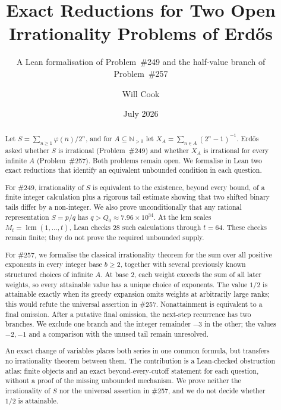\documentclass[11pt]{article}
\title{Exact Reductions for Two Open Irrationality Problems of Erd\H{o}s}
\subtitle{A Lean formalisation of Problem~\#249 and the half-value branch of Problem~\#257}
\author{Will Cook}
\date{July 2026}
\theoremstyle{definition}
\theoremstyle{remark}
\newcommand{\Npos}{\mathbb{N}_{>0}}
\newcommand{\ph}{\varphi}
\newcommand{\lcm}{\operatorname{lcm}}
\newcommand{\Qzero}{Q_0}
\begin{document}
\maketitle
{}

\begin{abstract}
\noindent
Let $S=\sum_{n\geq1}\ph(n)/2^n$, and for $A\subseteq\Npos$ let
$X_A=\sum_{n\in A}(2^n-1)^{-1}$.  Erd\H{o}s asked whether $S$ is
irrational (Problem~\#249) and whether $X_A$ is irrational for every
infinite $A$ (Problem~\#257).  Both problems remain open.  We formalise in
Lean two exact reductions that identify an equivalent unbounded condition
in each question.

For \#249, irrationality of $S$ is equivalent to the existence, beyond
every bound, of a finite integer calculation plus a rigorous tail estimate
showing that two shifted binary tails differ by a non-integer.  We also prove
unconditionally that any rational representation $S=p/q$ has
$q>\Qzero\approx7.96\times10^{34}$.  At the lcm scales
$M_t=\lcm(1,\ldots,t)$, Lean checks 28 such calculations through $t=64$.
These checks remain finite; they do not prove the required unbounded supply.

For \#257, we formalise the classical irrationality theorem for the sum over
all positive exponents in every integer base $b\geq2$, together with several
previously known structured choices of infinite $A$.  At base $2$, each weight exceeds the
sum of all later weights, so every attainable value has a unique choice of exponents.
The value $1/2$ is attainable exactly when its greedy expansion omits weights
at arbitrarily large ranks; this would refute the universal assertion in
\#257.  Nonattainment is equivalent to a final omission.  After a putative
final omission, the next-step recurrence has two branches.  We exclude one
branch and the integer remainder $-3$ in the other; the values $-2,-1$ and a
comparison with the unused tail remain unresolved.

An exact change of variables places both series in one common formula, but
transfers no irrationality theorem between them.  The contribution is a
Lean-checked obstruction atlas: finite objects and an exact
beyond-every-cutoff statement for each question, without a proof of the missing
unbounded mechanism.  We prove neither the irrationality of $S$ nor the
universal assertion in \#257, and we do not decide whether $1/2$ is attainable.
\end{abstract}
\end{document}
